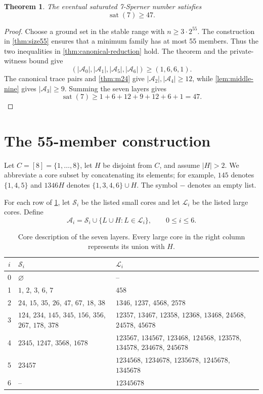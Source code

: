 \documentclass[a4paper,fleqn,longmktitle]{cas-sc}
\newtheorem{theorem}{Theorem}[section]
\theoremstyle{definition}
\theoremstyle{remark}
\newcommand{\smallcores}{\mathcal{S}}
\newcommand{\largecores}{\mathcal{L}}
\newcommand{\sat}{\operatorname{sat}}
\begin{document}
\begin{theorem}
\label{thm:sat7-lower}
The eventual saturated 7-Sperner number satisfies
\[
  \sat(7)\geq47.
\]
\end{theorem}

\begin{proof}
Choose a ground set in the stable range with $n\geq3\cdot2^{55}$.  The
construction in \cref{thm:size55} ensures that a minimum family has at most
55 members.  Thus the two inequalities in \cref{thm:canonical-reduction}
hold.  The theorem and the private-witness bound give
\[
  (|\mathcal A_0|,|\mathcal A_1|,|\mathcal A_5|,
  |\mathcal A_6|)\geq(1,6,6,1).
\]
The canonical trace pairs and \cref{thm:m24} give
$|\mathcal A_2|,|\mathcal A_4|\geq12$, while
\cref{lem:middle-nine} gives $|\mathcal A_3|\geq9$.  Summing the seven layers
gives
\[
  \sat(7)\geq1+6+12+9+12+6+1=47.
\]
\end{proof}

\section{The 55-member construction}
\label{sec:construction}

Let $C=[8]=\{1,\ldots,8\}$, let $H$ be disjoint from $C$, and assume
$|H|>2$.  We abbreviate a core subset by concatenating its elements; for
example, $145$ denotes $\{1,4,5\}$ and $1346H$ denotes
$\{1,3,4,6\}\cup H$.  The symbol $-$ denotes an empty list.

For each row of \cref{tab:layers}, let $\smallcores_i$ be the listed small
cores and let $\largecores_i$ be the listed large cores.  Define
\[
  \mathcal A_i
   =\smallcores_i\cup\{L\cup H:L\in\largecores_i\},
  \qquad 0\leq i\leq6.
\]

\begin{table}[htbp]
\centering
\small
\setlength{\tabcolsep}{4pt}
\renewcommand{\arraystretch}{1.18}
\begin{tabular}{c p{} p{}}
\toprule
$i$ & $\smallcores_i$ & $\largecores_i$ \\
\midrule
0 & $\varnothing$ & -- \\
1 & $1$, $2$, $3$, $6$, $7$ & $458$ \\
2 & $24$, $15$, $35$, $26$, $47$, $67$, $18$, $38$
  & $1346$, $1237$, $4568$, $2578$ \\
3 & $124$, $234$, $145$, $345$, $156$, $356$, $267$, $178$, $378$
  & $12357$, $13467$, $12358$, $12368$, $13468$, $24568$, $24578$, $45678$ \\
4 & $2345$, $1247$, $3568$, $1678$
  & $123567$, $134567$, $123468$, $124568$, $123578$, $134578$, $234678$, $245678$ \\
5 & $23457$
  & $1234568$, $1234678$, $1235678$, $1245678$, $1345678$ \\
6 & -- & $12345678$ \\
\bottomrule
\end{tabular}
\caption{Core description of the seven layers.  Every large core in the
right column represents its union with $H$.}
\label{tab:layers}
\end{table}
\end{document}
